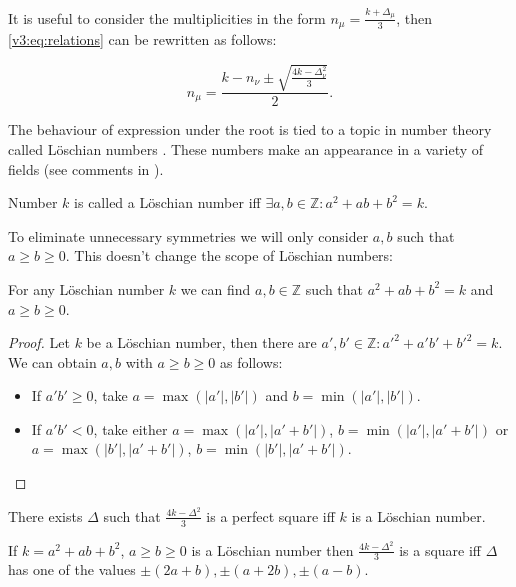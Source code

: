     It is useful to consider the multiplicities in the form $n_\mu = \frac{k+\Delta_\mu}{3}$, then \eqref{v3:eq:relations} can be rewritten as follows:

    \begin{equation}
        \label{v3:eq:relations_delta}
        n_{\mu} = \frac{k-n_\nu \pm \sqrt{\frac{4k-\Delta_\nu^2}{3}}}{2}.
    \end{equation}

The behaviour of expression under the root is tied to a topic in number theory called Löschian numbers \cite{oeisA003136}. These numbers make an appearance in a variety of fields (see comments in \cite{oeisA003136}).

    \begin{definition}
        \label{v3:def:loeschian}
        Number $k$ is called a Löschian number iff $\exists a,b \in \mathbb Z \colon a^2+ab+b^2=k$.
    \end{definition}

    To eliminate unnecessary symmetries we will only consider $a,b$ such that $a \geq b \geq 0$. This doesn't change the scope of Löschian numbers:

    \begin{lemma}
        \label{v3:lemma:loeschian}
        For any Löschian number $k$ we can find $a,b \in \mathbb Z$ such that $a^2+ab+b^2=k$ and $a \geq b \geq 0$.
    \end{lemma}

    \begin{proof}
        Let $k$ be a Löschian number, then there are $a',b'\in\mathbb Z\colon a'^2+a'b'+b'^2=k$. We can obtain $a,b$ with $a \geq b \geq 0$
as follows:
        \begin{itemize}
            \item If $a'b' \geq 0$, take $a=\max(|a'|,|b'|)$ and $b=\min(|a'|,|b'|)$.
            \item If $a'b'<0$, take either $a=\max(|a'|,|a'+b'|)$, $b=\min(|a'|,|a'+b'|)$ or $a=\max(|b'|,|a'+b'|)$, $b=\min(|b'|,|a'+b'|)$.
        \end{itemize}
    \end{proof}


    \begin{lemma}
        \label{v3:lemma:square}
        There exists $\Delta$ such that $\frac{4k-\Delta^2}{3}$ is a perfect square iff $k$ is a Löschian number.
        
        If $k=a^2+ab+b^2$, $a \geq b \geq 0$ is a Löschian number then $\frac{4k-\Delta^2}{3}$ is a square iff $\Delta$ has one of the values $\pm (2a+b), \pm (a+2b), \pm (a-b)$.
    \end{lemma}

